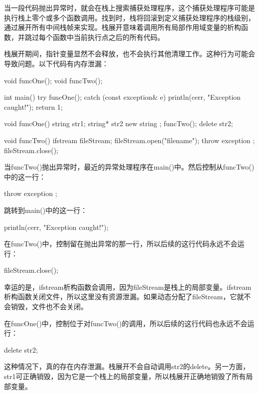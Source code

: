 
当一段代码抛出异常时，就会在栈上搜索捕获处理程序，这个捕获处理程序可能是执行栈上零个或多个函数调用。找到时，栈将回滚到定义捕获处理程序的栈级别，通过展开所有中间栈帧来实现。栈展开意味着调用所有局部作用域变量的析构函数，并跳过每个函数中当前执行点之后的所有代码。

栈展开期间，指针变量显然不会释放，也不会执行其他清理工作。这种行为可能会导致问题。以下代码有内存泄漏：

\begin{cpp}
void funcOne();
void funcTwo();

int main()
{
    try {
        funcOne();
    } catch (const exception& e) {
        println(cerr, "Exception caught!");
        return 1;
    }
}

void funcOne()
{
    string str1;
    string* str2 { new string {} };
    funcTwo();
    delete str2;
}

void funcTwo()
{
    ifstream fileStream;
    fileStream.open("filename");
    throw exception {};
    fileStream.close();
}
\end{cpp}

当funcTwo()抛出异常时，最近的异常处理程序在main()中。然后控制从funcTwo()中的这一行：

\begin{cpp}
throw exception {};
\end{cpp}

跳转到main()中的这一行：

\begin{cpp}
println(cerr, "Exception caught!");
\end{cpp}

在funcTwo()中，控制留在抛出异常的那一行，所以后续的这行代码永远不会运行：

\begin{cpp}
fileStream.close();
\end{cpp}

幸运的是，ifstream析构函数会调用，因为fileStream是栈上的局部变量。ifstream析构函数关闭文件，所以这里没有资源泄漏。如果动态分配了fileStream，它就不会销毁，文件也不会关闭。

在funcOne()中，控制位于对funcTwo()的调用，所以后续的这行代码也永远不会运行：

\begin{cpp}
delete str2;
\end{cpp}

这种情况下，真的存在内存泄漏。栈展开不会自动调用str2的delete。另一方面，str1可正确销毁，因为它是一个栈上的局部变量，所以栈展开正确地销毁了所有局部变量。

